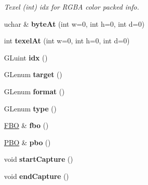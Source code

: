 \begin{DoxyCompactItemize}
\begin{DoxyCompactList}\small\item\em Texel (int) idx for R\-G\-B\-A color packed info. \end{DoxyCompactList}\item 
\hypertarget{classvsr_1_1_texture_a20004f69262db1e94e1aa4b2cce76b7a}{uchar \& {\bfseries byte\-At} (int w=0, int h=0, int d=0)}\label{classvsr_1_1_texture_a20004f69262db1e94e1aa4b2cce76b7a}

\item 
\hypertarget{classvsr_1_1_texture_a033d77004aac38e707cbc2b753043b87}{int {\bfseries texel\-At} (int w=0, int h=0, int d=0)}\label{classvsr_1_1_texture_a033d77004aac38e707cbc2b753043b87}

\item 
\hypertarget{classvsr_1_1_texture_afa87ceb16772167004e39311aa12ec0a}{G\-Luint {\bfseries idx} ()}\label{classvsr_1_1_texture_afa87ceb16772167004e39311aa12ec0a}

\item 
\hypertarget{classvsr_1_1_texture_ad6dee601b547fc6fba242f7d0863f481}{G\-Lenum {\bfseries target} ()}\label{classvsr_1_1_texture_ad6dee601b547fc6fba242f7d0863f481}

\item 
\hypertarget{classvsr_1_1_texture_a32af0a334dd806dbf263c6855f7ef43b}{G\-Lenum {\bfseries format} ()}\label{classvsr_1_1_texture_a32af0a334dd806dbf263c6855f7ef43b}

\item 
\hypertarget{classvsr_1_1_texture_a3f4342ecc0ab1cbf2b6113e4849d8363}{G\-Lenum {\bfseries type} ()}\label{classvsr_1_1_texture_a3f4342ecc0ab1cbf2b6113e4849d8363}

\item 
\hypertarget{classvsr_1_1_texture_a912587acdaf4c2516b720c34b7541b84}{\hyperlink{classvsr_1_1_f_b_o}{F\-B\-O} \& {\bfseries fbo} ()}\label{classvsr_1_1_texture_a912587acdaf4c2516b720c34b7541b84}

\item 
\hypertarget{classvsr_1_1_texture_a39f25e6e9a43c46304c7aa7c67fab2c6}{\hyperlink{classvsr_1_1_p_b_o}{P\-B\-O} \& {\bfseries pbo} ()}\label{classvsr_1_1_texture_a39f25e6e9a43c46304c7aa7c67fab2c6}

\item 
\hypertarget{classvsr_1_1_texture_aff8a99f5030190b2208cd8a72a0b899b}{void {\bfseries start\-Capture} ()}\label{classvsr_1_1_texture_aff8a99f5030190b2208cd8a72a0b899b}

\item 
\hypertarget{classvsr_1_1_texture_add90a20be94c2046bacb8cbed23060ed}{void {\bfseries end\-Capture} ()}\label{classvsr_1_1_texture_add90a20be94c2046bacb8cbed23060ed}


\end{DoxyCompactItemize}
